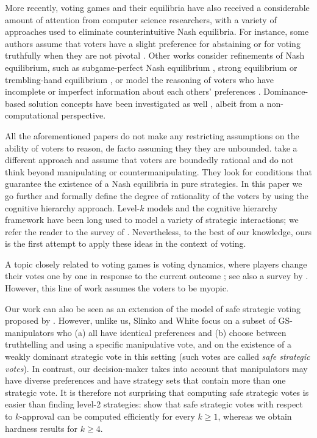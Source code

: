 \documentclass[11pt]{article}
\begin{document}
More recently, voting games and their equilibria have also received 
a considerable amount of attention from computer science researchers, with
a variety of approaches used to eliminate counterintuitive Nash equilibria.
For instance, some authors assume that voters have a slight preference for abstaining
or for voting truthfully when they are not pivotal
\citep{bat:j:abstentions,dut-sen:j:nash,des-elk:c:eq,tho-lev-ley:c:empirical,obr-mar-tho:c:truth-biased,emos15,OLMRR15}.
Other works consider refinements of Nash equilibrium, such as subgame-perfect Nash equilibrium 
\citep{des-elk:c:eq,xia-con:c:spne}, strong equilibrium \citep{mes-pol:j:strong} 
or trembling-hand equilibrium \citep{OREPJ16},
or model the reasoning of voters who have incomplete or imperfect information about each others'
preferences \citep{mye-web:j:voting,Myatt2007,MLR14}.
Dominance-based solution concepts have been investigated as well 
\citep{mou:j:dominance,dhi-loc:j:dominance,bue-dhi-vid:j:domsolv,dellis2010weak,MLR14}, 
albeit from a non-computational perspective.
  
All the aforementioned papers do not make any restricting assumptions on the ability of voters to reason, de facto assuming they they are unbounded. 
\cite{GHRS} take a different approach and assume that voters are boundedly rational and do not think beyond manipulating or countermanipulating. 
They look for conditions that guarantee the existence of a Nash equilibria in pure strategies.  In this paper we go further and formally define the degree of rationality of the voters by using the cognitive hierarchy approach. Level-$k$ models and the cognitive hierarchy framework have been long used to model a variety of strategic interactions;
we refer the reader to the survey of \citet{crawford2013structural}. Nevertheless, to the best
of our knowledge, ours is the first attempt to apply these ideas in the context of voting.

A  topic closely related to voting games is voting dynamics, where players change their votes one by one in response to the current outcome
\citep{mei-pol:c:convergence,rei-end:c:polls,rey-wil:c:bestreply,OMPRJ15,EOPR16,lev-ros:j:iterative,KSLR17}; 
see also a survey by \citet{Meir-trends}.  
However, this line of work assumes the voters to be myopic.

Our work can also be seen as an extension of the model of safe strategic voting proposed by \citet{safe2}. 
However, unlike us, Slinko
and White focus on a subset of GS-manipulators who (a) all have identical preferences
and (b) choose between truthtelling and using a specific manipulative vote,  
and on the existence of a weakly dominant strategic vote in this setting
(such votes are called {\em safe strategic votes}). In contrast, our decision-maker takes into account that
manipulators may have diverse preferences and have strategy sets that contain more than one strategic vote.
It is therefore not surprising that computing safe strategic votes is easier than finding level-2 strategies:
\citet{safe-sagt} show that safe strategic votes with respect to $k$-approval can be computed efficiently
for every $k\ge 1$, whereas we obtain hardness results for $k\ge 4$. 
\end{document}
